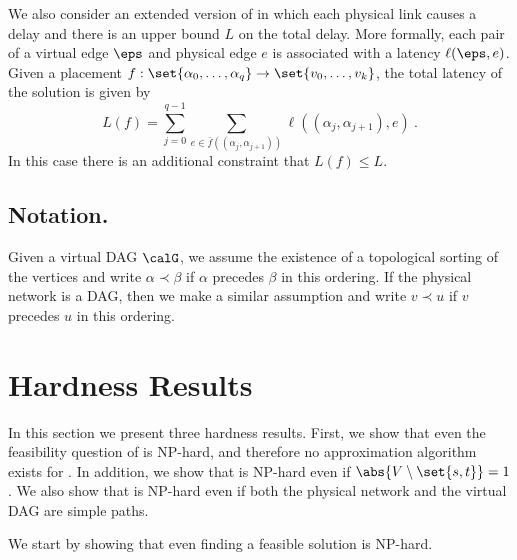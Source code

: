 
We also consider an extended version of \scp in which each physical
link causes a delay and there is an upper bound $L$ on the total
delay.  More formally, each pair of a virtual edge $\eps$ and physical
edge $e$ is associated with a latency $\ell(\eps,e)$.
%
Given a placement $f: \set{\alpha_0,\ldots,\alpha_q} \to
\set{v_0,\ldots,v_k}$, the total latency of the solution is given by
\[
L(f)
= \sum_{j=0}^{q-1} \sum_{e \in \bar{f}((\alpha_j,\alpha_{j+1}))} \ell((\alpha_j,\alpha_{j+1}),e)
~.
\]
In this case there is an additional constraint that $L(f) \leq L$.



%

\subsection*{Notation.}
%
Given a virtual DAG $\calG$, we assume the existence of a topological
sorting of the vertices and write $\alpha \prec \beta$ if $\alpha$
precedes $\beta$ in this ordering.  If the physical network is a DAG,
then we make a similar assumption and write $v \prec u$ if $v$
precedes $u$ in this ordering.



\section{Hardness Results}

In this section we present three hardness results.  First, we show
that even the feasibility question of \scp is NP-hard, and therefore
no approximation algorithm exists for \scp.  In addition, we show that
\scp is NP-hard even if $\abs{V \setminus \set{s,t}} = 1$.  We also
show that \scp is NP-hard even if both the physical network and the
virtual DAG are simple paths.

We start by showing that even finding a feasible solution is NP-hard.


